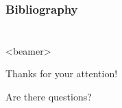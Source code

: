 \documentclass{beamer}
\begin{document}
\subsection*{}
\begin{frame}
	\frametitle{Bibliography}
	\printbibliography
\end{frame}

\section*{}

\begin{frame}<beamer>{}
	\begin{center}
		Thanks for your attention!
	\end{center}
	\begin{center}
		Are there questions?
	\end{center}
\end{frame}
\end{document}
